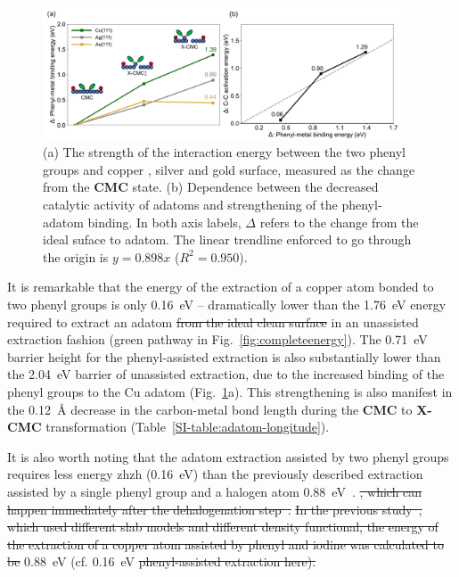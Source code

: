 \documentclass[aps,prb,amsmath,amssymb,11pt]{revtex4-1}
\newcommand{\zhzh}{\color{blue}}
\newcommand{\zhzh}{\color{blue}}
\begin{document}
\begin{figure}[bt]
\centering
\includegraphics[width=0.95\textwidth]{Fig/onlysurface.pdf}
\caption{
(a) The strength of the interaction energy between the two phenyl groups and copper {\zhzh, silver and gold} surface, measured as the change from the \textbf{CMC} state. (b) Dependence between the decreased catalytic activity of adatoms and strengthening of the phenyl-adatom binding. In both axis labels, $\Delta$ refers to the change from the ideal suface to adatom. The linear trendline enforced to go through the origin is $y=0.898 x$ ($R^2 = 0.950$).}
\label{fig:onlysurface}
\end{figure}

It is remarkable that the energy of the extraction of a copper atom bonded to two phenyl groups is only \SI{0.16}{\electronvolt} -- dramatically lower than the \SI{1.76}{\electronvolt} energy required to extract an adatom \sout{from the ideal clean surface} {\zhzh in an unassisted extraction fashion} (green pathway in Fig.~\ref{fig:completeenergy}). The \SI{0.71}{\electronvolt} barrier height for the phenyl-assisted extraction is also substantially lower than the \SI{2.04}{\electronvolt} barrier of unassisted extraction, due to the increased binding of the phenyl groups to the Cu adatom (Fig.~\ref{fig:onlysurface}a). This strengthening is also manifest in the \SI{0.12}{\angstrom} decrease in the carbon-metal bond length during the \textbf{CMC} to \textbf{X-CMC} transformation (Table~\ref{SI-table:adatom-longitude}).

It is also worth noting that the adatom extraction assisted by two phenyl groups requires less energy {zhzh (\SI{0.16}{\electronvolt})} than the previously described extraction assisted by a single phenyl group and a halogen atom {\zhzh \SI{0.88}{\electronvolt}~\cite{chemeurope2017}.} \sout{, which can happen immediately after the dehalogenation step~\cite{chemeurope2017}.} \sout{In the previous study~\cite{chemeurope2017}, which used different slab models and different density functional, the energy of the extraction of a copper atom assisted by phenyl and iodine was calculated to be }\SI{0.88}{\electronvolt} (cf. \SI{0.16}{\electronvolt} \sout{phenyl-assisted extraction here).}
\end{document}

